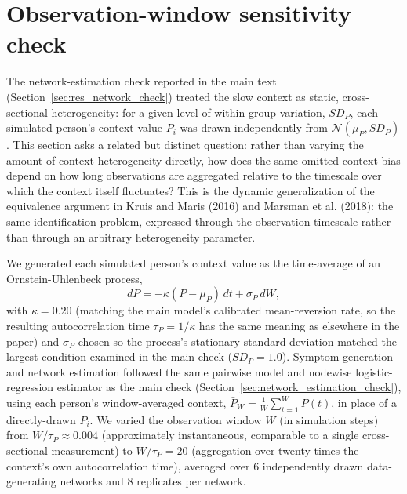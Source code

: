 \section{Observation-window sensitivity check}\label{app:window_check}

The network-estimation check reported in the main text (Section~\ref{sec:res_network_check})
treated the slow context as static, cross-sectional heterogeneity: for a given level of
within-group variation, $SD_P$, each simulated person's context value $P_i$ was drawn
independently from $\mathcal N(\mu_P, SD_P)$. This section asks a related but distinct
question: rather than varying the amount of context heterogeneity directly, how does the
same omitted-context bias depend on how long observations are aggregated relative to the
timescale over which the context itself fluctuates? This is the dynamic generalization of
the equivalence argument in Kruis and Maris (2016) and Marsman et al. (2018): the same
identification problem, expressed through the observation timescale rather than through an
arbitrary heterogeneity parameter.

We generated each simulated person's context value as the time-average of an
Ornstein-Uhlenbeck process,
\[
dP = -\kappa(P - \mu_P)\,dt + \sigma_P\,dW,
\]
with $\kappa = 0.20$ (matching the main model's calibrated mean-reversion rate, so the
resulting autocorrelation time $\tau_P = 1/\kappa$ has the same meaning as elsewhere in the
paper) and $\sigma_P$ chosen so the process's stationary standard deviation matched the
largest condition examined in the main check ($SD_P = 1.0$). Symptom generation and network
estimation followed the same pairwise model and nodewise logistic-regression estimator as
the main check (Section~\ref{sec:network_estimation_check}), using each person's
window-averaged context, $\bar P_W = \tfrac{1}{W}\sum_{t=1}^W P(t)$, in place of a
directly-drawn $P_i$. We varied the observation window $W$ (in simulation steps) from
$W/\tau_P \approx 0.004$ (approximately instantaneous, comparable to a single cross-sectional
measurement) to $W/\tau_P = 20$ (aggregation over twenty times the context's own
autocorrelation time), averaged over 6 independently drawn data-generating networks and 8
replicates per network.

